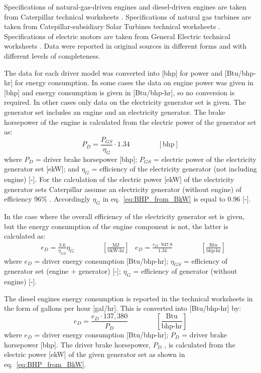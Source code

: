 \documentclass[11pt]{report}
\newcommand{\eqnunit}[1]{\quad\quad \scriptstyle{\left[\text{#1}\right]}}
\newcommand{\eqnunitfrac}[2]{\quad\quad \scriptstyle{\left[\frac{\text{#1}}{\text{#2}}\right]}}
\begin{document}
Specifications of natural-gas-driven engines and diesel-driven engines are taken from Caterpillar technical worksheets \cite{Caterpillar2012}. Specifications of natural gas turbines are taken from Catepillar-subsidiary Solar Turbines technical worksheets \cite{Solarturbines2012}. Specifications of electric motors are taken from General Electric technical worksheets \cite{GE2011}. Data were reported in original sources in different forms and with different levels of completeness.

The data for each driver model was converted into [bhp] for power and [Btu/bhp-hr] for energy consumption. In some cases the data on engine power was given in [bhp] and energy consumption is given in [Btu/bhp-hr], so no conversion is required. In other cases only data on the electricity generator set is given. The generator set includes an engine and an electricity generator. The brake horsepower of the engine is calculated from the electric power of the generator set as:
\begin{equation}\label{eq:BHP_from_BkW}
P_{D}= \frac{P_{GS}}{\eta_{G}} \cdot 1.34 \quad\quad\eqnunit{bhp}
\end{equation}
where $P_{D}$ = driver brake horsepower [bhp]; $P_{GS}$ = electric power of the electricity generator set [ekW]; and $\eta_{G}$ = efficiency of the electricity generator (not including engine) [-]. For the calculation of the electric power [ekW] of the electricity generator sets Caterpillar assume an electricity generator (without engine) of efficiency 96\% \cite[p. 4]{Caterpillar2012b}. Accordingly $\eta_{G}$ in eq.\ \eqref{eq:BHP_from_BkW} is equal to 0.96 [-].


In the case where the overall efficiency of the electricity generator set is given, but the energy consumption of the engine component is not, the latter is calculated as:
\begin{equation} \label{eq:calc_EC_eff}
\begin{split}
& e_{D} = \frac{3.6}{\eta_{GS}} \eta_{G} \quad\quad\eqnunitfrac{MJ}{bkW-hr}
& e_{D} = \frac{e_{D} \cdot 947.8}{1.34} \quad\quad\eqnunitfrac{Btu}{bhp-hr}
\end{split}
\end{equation}
where $e_{D}$ = driver energy consumption [Btu/bhp-hr]; $\eta_{GS}$ = efficiency of generator set (engine + generator) [-]; $\eta_{G}$ = efficiency of generator (without engine) [-].

The diesel engines energy consumption is reported in the technical worksheets in the form of gallons per hour [gal/hr]. This is converted into [Btu/bhp-hr] by:
\begin{equation} \label{eq:diesel_engine_EC_unit_conversion}
e_{D} = \frac{e_{D} \cdot137,380 }{P_{D}} \quad\quad\eqnunitfrac{Btu}{bhp-hr}
\end{equation}
where $e_{D}$ = driver energy consumption [Btu/bhp-hr]; $P_{D}$ = driver brake horsepower [bhp]. The driver brake horsepower, $P_{D}$ , is calculated from the electric power [ekW] of the given generator set as shown in eq.\ \eqref{eq:BHP_from_BkW}.
\end{document}
